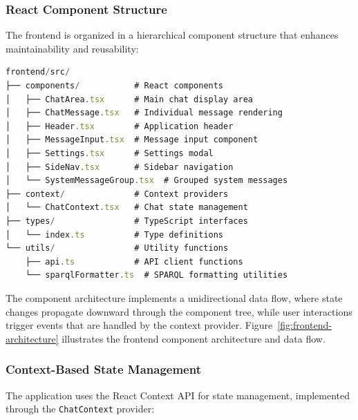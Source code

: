 \subsubsection{React Component Structure}
The frontend is organized in a hierarchical component structure that enhances maintainability and reusability:

\begin{lstlisting}[breaklines=true,language=typescript, caption=React Component Structure, label=code:react-component-structure]
frontend/src/
├── components/           # React components
│   ├── ChatArea.tsx      # Main chat display area
│   ├── ChatMessage.tsx   # Individual message rendering
│   ├── Header.tsx        # Application header
│   ├── MessageInput.tsx  # Message input component
│   ├── Settings.tsx      # Settings modal
│   ├── SideNav.tsx       # Sidebar navigation
│   └── SystemMessageGroup.tsx  # Grouped system messages
├── context/              # Context providers
│   └── ChatContext.tsx   # Chat state management
├── types/                # TypeScript interfaces
│   └── index.ts          # Type definitions
└── utils/                # Utility functions
    ├── api.ts            # API client functions
    └── sparqlFormatter.ts  # SPARQL formatting utilities
\end{lstlisting}

The component architecture implements a unidirectional data flow, where state changes propagate downward through the component tree, while user interactions trigger events that are handled by the context provider. Figure~\ref{fig:frontend-architecture} illustrates the frontend component architecture and data flow.

\subsubsection{Context-Based State Management}
The application uses the React Context API for state management, implemented through the \texttt{ChatContext} provider:

